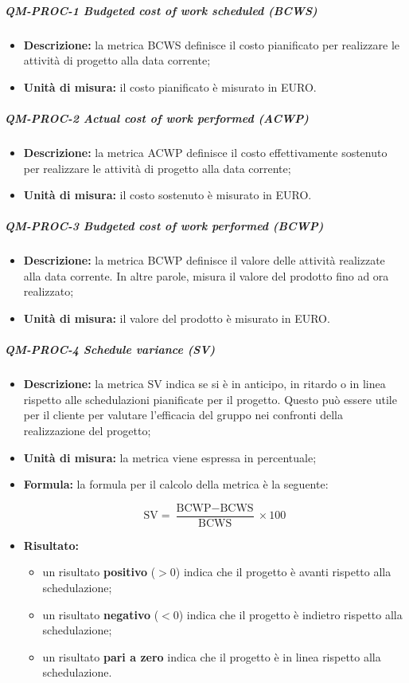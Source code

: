 			\subparagraph{QM-PROC-1 Budgeted cost of work scheduled (BCWS)}
			\begin{itemize}
				\item \textbf{Descrizione:} 
				la metrica BCWS definisce il costo pianificato per realizzare le attività di progetto alla data corrente;

				\item \textbf{Unità di misura:} 
				il costo pianificato è misurato in EURO.
			\end{itemize}
			\subparagraph{QM-PROC-2 Actual cost of work performed (ACWP)}
			\begin{itemize}
				\item \textbf{Descrizione:} 
				la metrica ACWP definisce il costo effettivamente sostenuto per realizzare le attività di progetto alla data corrente;

				\item \textbf{Unità di misura:} 
				il costo sostenuto è misurato in EURO.
			\end{itemize}
			\subparagraph{QM-PROC-3 Budgeted cost of work performed (BCWP)}
			\begin{itemize}
				\item \textbf{Descrizione:} 
				la metrica BCWP definisce il valore delle attività realizzate alla data corrente. In altre parole, misura il valore del prodotto fino ad ora realizzato;

				\item \textbf{Unità di misura:} 
				il valore del prodotto è misurato in EURO.
			\end{itemize}
			\subparagraph{QM-PROC-4 Schedule variance (SV)}
			\begin{itemize}
				\item \textbf{Descrizione:} 
				la metrica SV indica se si è in anticipo, in ritardo o in linea rispetto alle schedulazioni pianificate per il progetto. Questo può essere utile per il cliente per valutare l'efficacia del gruppo nei confronti della realizzazione del progetto;

				\item \textbf{Unità di misura:} 
				la metrica viene espressa in percentuale;

				\item \textbf{Formula:} 
				la formula per il calcolo della metrica è la seguente:

				\[
					\text{SV} = \frac{\text{BCWP} - \text{BCWS}}{\text{BCWS}} \times 100
				\]

				\item \textbf{Risultato:} 
				\begin{itemize}
					\item un risultato \textbf{positivo} (\(> 0\)) indica che il progetto è avanti rispetto alla schedulazione;
					\item un risultato \textbf{negativo} (\(< 0\)) indica che il progetto è indietro rispetto alla schedulazione;
					\item un risultato \textbf{pari a zero} indica che il progetto è in linea rispetto alla schedulazione.
				\end{itemize}
			\end{itemize}
